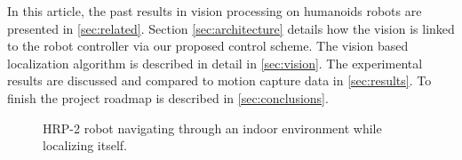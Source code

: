 In this article, the past results in vision processing on humanoids
robots are presented in \ref{sec:related}. Section
\ref{sec:architecture} details how the vision is linked to the robot
controller via our proposed control scheme. The vision based
localization algorithm is described in detail in \ref{sec:vision}. The
experimental results are discussed and compared to motion capture data
in \ref{sec:results}. To finish the project roadmap is described in
\ref{sec:conclusions}.

\begin{figure}[ht]
  \begin{center}
  \end{center}
  \caption{HRP-2 robot navigating through an indoor environment while
    localizing itself.\label{fig:xp_final}}
\end{figure}

